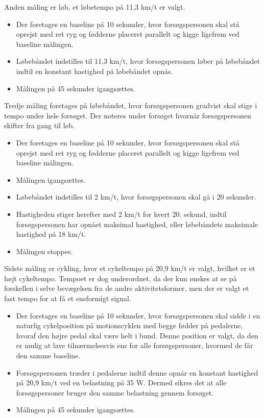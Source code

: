 Anden måling er løb, et løbetempo på 11,3 km/t er valgt\citep{Miles2007}. \vspace{-3mm}
\begin{itemize}
	\item Der foretages en baseline på 10 sekunder, hvor forsøgspersonen skal stå oprejst med ret ryg og fødderne placeret parallelt og kigge ligefrem ved baseline målingen.
	\item Løbebåndet indstilles til 11,3 km/t, hvor forsøgspersonen løber på løbebåndet indtil en konstant hastighed på løbebåndet opnås. 
	\item Målingen på 45 sekunder igangsættes.
\end{itemize}

Tredje måling foretages på løbebåndet, hvor forsøgspersonen gradvist skal stige i tempo under hele forsøget. Der noteres under forsøget hvornår forsøgspersonen skifter fra gang til løb.  \vspace{-3mm}
\begin{itemize}
	\item Der foretages en baseline på 10 sekunder, hvor forsøgspersonen skal stå oprejst med ret ryg og fødderne placeret parallelt og kigge ligefrem ved baseline målingen.
	\item Målingen igangsættes.
	\item Løbebåndet indstilles til 2 km/t, hvor forsøgspersonen skal gå i 20 sekunder.  
	\item Hastigheden stiger herefter med 2 km/t for hvert 20. sekund, indtil forsøgspersonen har opnået maksimal hastighed, eller løbebåndets maksimale hastighed på 18 km/t. 
	\item Målingen stoppes. 
\end{itemize}

Sidste måling er cykling, hvor et cykeltempo på 20,9 km/t er valgt, hvilket er et højt cykeltempo\citep{Miles2007}. Tempoet er dog underordnet, da der kun ønskes at se på forskellen i selve bevægelsen fra de andre aktivitetsformer, men der er valgt et fast tempo for at få et ensformigt signal. \vspace{-3mm}
\begin{itemize}
	\item Der foretages en baseline på 10 sekunder, hvor forsøgspersonen skal sidde i en naturlig cykelposition på motionscyklen med begge fødder på pedalerne, hvoraf den højre pedal skal være helt i bund. Denne position er valgt, da den er mulig at lave tilnærmelsesvis ens for alle forsøgspersoner, hvormed de får den samme baseline.
	\item Forsøgspersonen træder i pedalerne indtil denne opnår en konstant hastighed på 20,9 km/t ved en belastning på 35 W. Dermed sikres det at alle forsøgspersoner bruger den samme belastning gennem forsøget.  
	\item Målingen på 45 sekunder igangsættes. 
\end{itemize}


